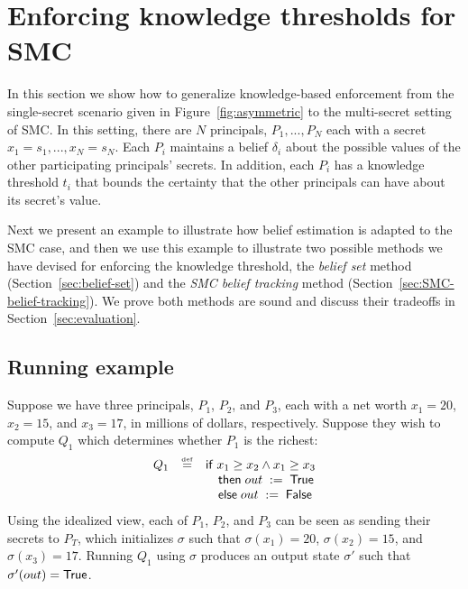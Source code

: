 \documentclass[10pt]{sigplanconf}
\begin{document}

\section{Enforcing knowledge thresholds for SMC}
\label{sec:SMC-KBSE}

In this section we show how to generalize knowledge-based enforcement
from the single-secret scenario given in Figure~\ref{fig:asymmetric}
to the multi-secret setting of SMC.  In this
setting, there are $N$ principals, $P_1, ..., P_N$ each with a secret
$x_1 = s_1, ..., x_N = s_N$.  Each $P_i$ maintains a belief $\delta_i$
about the possible values of the other participating principals'
secrets.  In addition, each $P_i$ has a knowledge
threshold $t_i$ that bounds the certainty that the other principals
can have about its secret's value.

Next we present an example to
illustrate how belief estimation is adapted to the SMC case, and then
we use this example to illustrate two possible methods we have devised
for enforcing the knowledge threshold, the \emph{belief set} method
(Section~\ref{sec:belief-set}) and
the \emph{SMC belief tracking} method
(Section~\ref{sec:SMC-belief-tracking}).  We prove both methods are
sound and discuss their tradeoffs in Section~\ref{sec:evaluation}.

\subsection{Running example}

Suppose we have three principals, $P_1$, $P_2$, and $P_3$, each with a
net worth $x_1 = 20$, $x_2 = 15$, and $x_3 = 17$, in millions of
dollars, respectively.  Suppose they wish to compute $Q_1$ which
determines whether $P_1$ is the richest:
$$
\begin{array}{lcl}
Q_1 & \stackrel{\smash{\scriptscriptstyle \mathrm{def}}}=  & \mathsf{if}\; x_1 \geq x_2 \wedge x_1 \geq
  x_3 \\
&& \quad  \mathsf{then}\;{out}\;:=\;{\mathsf{True}} \\
&& \quad \mathsf{else}\; {out}\;:=\;{\mathsf{False}}
\end{array}
$$
Using the idealized view, each of $P_1$, $P_2$, and $P_3$ can be seen
as sending their secrets to $P_T$, which initializes $\sigma$
such that $\sigma(x_1) = 20$, $\sigma(x_2) = 15$, and $\sigma(x_3) =
17$.  Running $Q_1$ using $\sigma$ produces
an output state $\sigma'$ such that $\sigma'(out) = \mathsf{True}$.
\end{document}
